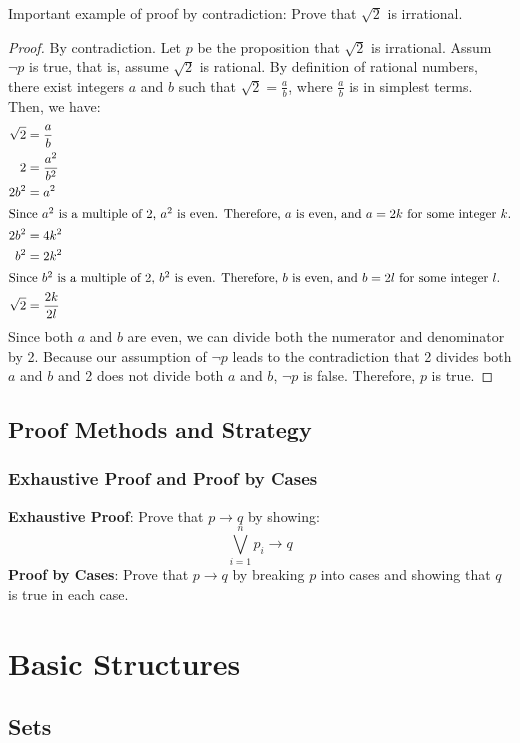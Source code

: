 \documentclass[article, 11pt]{article}
\theoremstyle{definition}
\begin{document}
    Important example of proof by contradiction: Prove that $\sqrt{2}$ is irrational.
    \begin{proof} By contradiction. Let $p$ be the proposition that $\sqrt{2}$ is irrational. Assum $\neg p$ is true, that is, assume $\sqrt{2}$ is rational. By definition of rational numbers, there exist integers $a$ and $b$ such that $\sqrt{2} = \frac{a}{b}$, where $\frac{a}{b}$ is in simplest terms. Then, we have:
    \begin{align*}
        \sqrt{2} &= \frac{a}{b} \\
               2 &= \frac{a^2}{b^2} \\
            2b^2 &= a^2 \\
        \intertext{Since $a^2$ is a multiple of 2, $a^2$ is even. Therefore, $a$ is even, and $a = 2k$ for some integer $k$.}
           2b^2 &= 4k^2 \\
            b^2 &= 2k^2 \\
        \intertext{Since $b^2$ is a multiple of 2, $b^2$ is even. Therefore, $b$ is even, and $b = 2l$ for some integer $l$.}
        \sqrt{2} &= \frac{2k}{2l}
    \end{align*}
    Since both $a$ and $b$ are even, we can divide both the numerator and denominator by 2. Because our assumption of $\neg p$ leads to the contradiction that 2 divides both $a$ and $b$ and 2 does not divide both $a$ and $b$, $\neg p$ is false. Therefore, $p$ is true.
    \end{proof}
    \subsection{Proof Methods and Strategy}
    \subsubsection{Exhaustive Proof and Proof by Cases}
    \textbf{Exhaustive Proof}: Prove that $p \to q$ by showing:
    \begin{equation*}
        \bigvee_{i=1}^n p_i \to q
    \end{equation*}
    \textbf{Proof by Cases}: Prove that $p \to q$ by breaking $p$ into cases and showing that $q$ is true in each case.
    \section{Basic Structures}
    \subsection{Sets}
\end{document}
